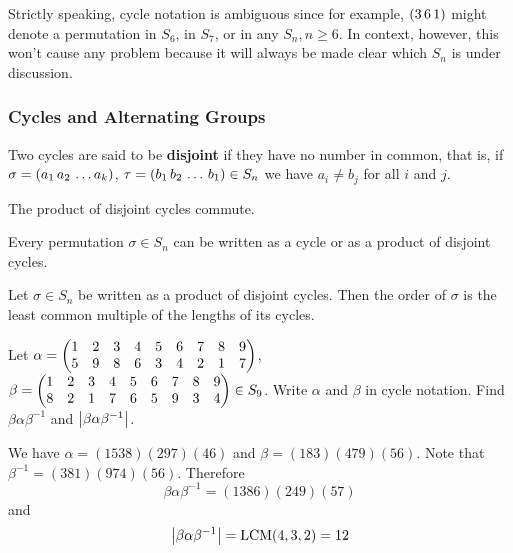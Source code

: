 \begin{remark}
    Strictly speaking, cycle notation is ambiguous since for example, $\qty(3 \, 6 \, 1)$ might denote a permutation in $S_6$, in $S_7$, or in any $S_n, n \geq 6$. In context, however, this won't cause any problem because it will always be made clear which $S_n$ is under discussion.
\end{remark}

\subsubsection{Cycles and Alternating Groups}

\begin{definition}
    Two cycles are said to be \textbf{disjoint} if they have no number in common, that is, if $\sigma = \qty(a_1 \, a_2 \, \ldots a_k)$, $\tau = \qty(b_1 \, b_2 \, \ldots \, b_1) \in S_n$ we have $a_i \neq b_j$ for all $i$ and $j$.
\end{definition}

\begin{theorem}
    The product of disjoint cycles commute.
\end{theorem}

\begin{remark}
    Every permutation $\sigma \in S_n$ can be written as a cycle or as a product of disjoint cycles.
\end{remark}

\begin{theorem}
    Let $\sigma \in S_n$ be written as a product of disjoint cycles. Then the order of $\sigma$ is the least common multiple of the lengths of its cycles.
\end{theorem}

\begin{exercise}
    Let $\alpha = \mqty(1 & 2 & 3 & 4 & 5 & 6 & 7 & 8 & 9 \\ 5 & 9 & 8 & 6 & 3 & 4 & 2 & 1 & 7)$, $\beta = \mqty(1 & 2 & 3 & 4 & 5 & 6 & 7 & 8 & 9 \\ 8 & 2 & 1 & 7 & 6 & 5 & 9 & 3 & 4) \in S_9$. Write $\alpha$ and $\beta$ in cycle notation. Find $\beta \alpha \beta^{-1}$ and $\qty|\beta \alpha \beta^{-1}|$.
\end{exercise}

\begin{solution}
    We have $\alpha = (1538)(297)(46)$ and $\beta = (183)(479)(56)$. Note that $\beta^{-1} = (381)(974)(56)$. Therefore
    \[ \beta \alpha \beta^{-1} = (1386)(249)(57) \]
    and 
    \[ \qty|\beta \alpha \beta^{-1}| = \text{LCM} (4, 3, 2) = 12 \]
\end{solution}


